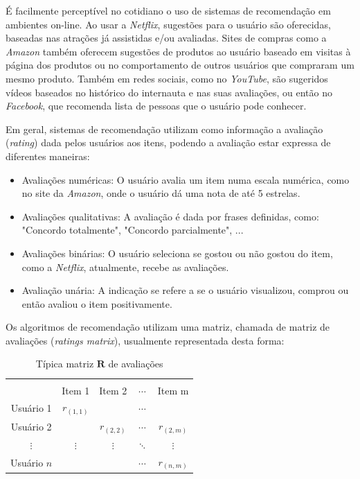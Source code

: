 \documentclass[12pt,a4paper,header]{abnt}
\begin{document}
É facilmente perceptível no cotidiano o uso de sistemas de recomendação em ambientes on-line. Ao usar a \textit{Netflix}, sugestões para o usuário são oferecidas, baseadas nas atrações já assistidas e/ou avaliadas. Sites de compras como a \textit{Amazon} também oferecem sugestões de produtos ao usuário baseado em visitas à página dos produtos ou no comportamento de outros usuários que compraram um mesmo produto. Também em redes sociais, como no \textit{YouTube}, são sugeridos vídeos baseados no histórico do internauta e nas suas avaliações, ou então no \textit{Facebook}, que recomenda lista de pessoas que o usuário pode conhecer\cite{gorakala2015building}.

Em geral, sistemas de recomendação utilizam como informação a avaliação (\textit{rating}) dada pelos usuários aos itens, podendo a avaliação estar expressa de diferentes maneiras\cite{shapira2011recommender}:

\begin{itemize}

\item Avaliações numéricas: O usuário avalia um item numa escala numérica, como no site da \textit{Amazon}, onde o usuário dá uma nota de até 5 estrelas.

\item Avaliações qualitativas: A avaliação é dada por frases definidas, como: "Concordo totalmente", "Concordo parcialmente", ...

\item Avaliações binárias: O usuário seleciona se gostou ou não gostou do item, como a \textit{Netflix}, atualmente, recebe as avaliações.

\item Avaliação unária: A indicação se refere a se o usuário visualizou, comprou ou então avaliou o item positivamente.

\end{itemize}

Os algoritmos de recomendação utilizam uma matriz, chamada de matriz de avaliações (\textit{ratings matrix}), usualmente representada desta forma:

\begin{table}[!h]
\centering
\caption{Típica matriz $\mathbf{R}$ de avaliações}
\label{rating_matrix}
\begin{tabular}{c|c|c|c|c}
\hline \\
            & Item 1      & Item 2      & $\cdots$ & Item m      \\
Usuário 1   & $r_{(1, 1)}$ &             & $\cdots$  &             \\
Usuário 2   &  & $r_{(2, 2)}$ & $\cdots$ & $r_{(2, m)}$ \\
$\vdots$       &    $\vdots$  & $\vdots$       &  $\ddots$ & $\vdots$ \\
Usuário $n$ &  &             & $\cdots$ & $r_{(n, m)}$ \\
\hline
\end{tabular}
\end{table}
\end{document}
